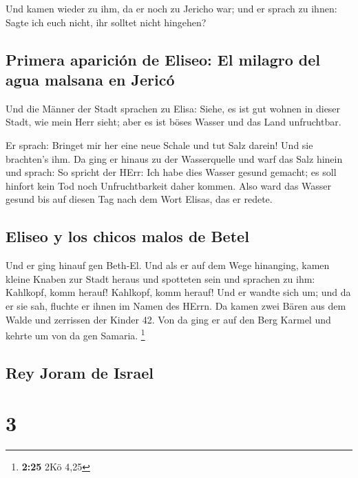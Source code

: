  Und kamen wieder zu ihm, da er noch zu Jericho war; und
er sprach zu ihnen: Sagte ich euch nicht, ihr solltet nicht hingehen?

\hypertarget{primera-apariciuxf3n-de-eliseo-el-milagro-del-agua-malsana-en-jericuxf3}{%
\subsection{Primera aparición de Eliseo: El milagro del agua malsana en
Jericó}\label{primera-apariciuxf3n-de-eliseo-el-milagro-del-agua-malsana-en-jericuxf3}}

 Und die Männer der Stadt sprachen zu Elisa: Siehe, es
ist gut wohnen in dieser Stadt, wie mein Herr sieht; aber es ist böses
Wasser und das Land unfruchtbar.

 Er sprach: Bringet mir her eine neue Schale und tut Salz
darein! Und sie brachten's ihm.  Da ging er hinaus zu der
Wasserquelle und warf das Salz hinein und sprach: So spricht der HErr:
Ich habe dies Wasser gesund gemacht; es soll hinfort kein Tod noch
Unfruchtbarkeit daher kommen.  Also ward das Wasser
gesund bis auf diesen Tag nach dem Wort Elisas, das er redete.

\hypertarget{eliseo-y-los-chicos-malos-de-betel}{%
\subsection{Eliseo y los chicos malos de
Betel}\label{eliseo-y-los-chicos-malos-de-betel}}

 Und er ging hinauf gen Beth-El. Und als er auf dem Wege
hinanging, kamen kleine Knaben zur Stadt heraus und spotteten sein und
sprachen zu ihm: Kahlkopf, komm herauf! Kahlkopf, komm herauf!
 Und er wandte sich um; und da er sie sah, fluchte er
ihnen im Namen des HErrn. Da kamen zwei Bären aus dem Walde und
zerrissen der Kinder 42.  Von da ging er auf den Berg
Karmel und kehrte um von da gen Samaria. \footnote{\textbf{2:25} 2Kö
  4,25}

\hypertarget{rey-joram-de-israel}{%
\subsection{Rey Joram de Israel}\label{rey-joram-de-israel}}

\hypertarget{section-2}{%
\section{3}\label{section-2}}

